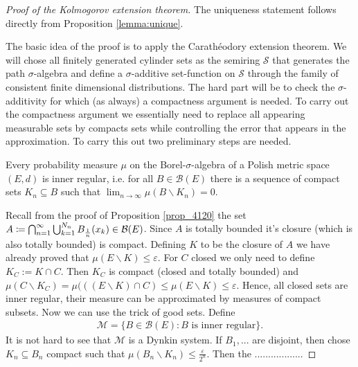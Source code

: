 \begin{proof}[Proof of the Kolmogorov extension theorem]
	The uniqueness statement follows directly from Proposition \ref{lemma:unique}.\smallskip

	The basic idea of the proof is to apply the Carath\'eodory extension theorem. We will chose all finitely generated cylinder sets as the semiring $\mathcal S$ that generates the path $\sigma$-algebra and define a $\sigma$-additive set-function on $\mathcal S$ through the family of consistent finite dimensional distributions. The hard part will be to check the $\sigma$-additivity for which (as always) a compactness argument is needed. To carry out the compactness argument we essentially need to replace all appearing measurable sets by compacts sets while controlling the error that appears in the approximation. To carry this out two preliminary steps are needed.
	\begin{lstep}
		Every probability measure $\mu$ on the Borel-$\sigma$-algebra of a Polish metric space $(E,d)$ is inner regular, i.e. for all $B\in \mathcal B(E)$ there is a sequence of compact sets $K_n\subseteq B$ such that $\lim_{n\to\infty}\mu(B\backslash K_n)= 0.$
	\end{lstep}

	Recall from the proof of Proposition \ref{prop_4120} the set $A \coloneqq \bigcap_{n=1}^{\infty} \bigcup_{k=1}^{N_n}B_{\frac{1}{n}}(x_k) \in\mathcal{B}(E)$. Since $A$ is totally bounded it's closure (which is also totally bounded) is compact. Defining $K$ to be the closure of $A$  we have already proved that $\mu(E\backslash K)\leq \varepsilon$. For $C$ closed we only need to define $K_C:=K\cap C$. Then $K_C$ is compact (closed and totally bounded) and $\mu(C\backslash K_C)=\mu(((E\backslash K)\cap C)\leq \mu(E\backslash K)\leq \varepsilon$. Hence, all closed sets are inner regular, their measure can be approximated by measures of compact subsets. Now we can use the trick of good sets. Define 
	\begin{align*}
		\mathcal M=\{B\in \mathcal B(E): B\text{ is inner regular}\}.
	\end{align*}
	It is not hard to see that $\mathcal M$ is a Dynkin system. If $B_1,...$ are disjoint, then chose $K_n\subseteq B_n$ compact such that $\mu(B_n\backslash K_n)\leq \frac{\varepsilon}{2^n}$. Then the ..................
	
	
	

\end{proof}
